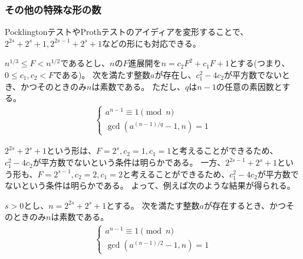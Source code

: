 \subsubsection{その他の特殊な形の数}
PocklingtonテストやProthテストのアイディアを変形することで、$2^{2s}+2^s+1, 2^{2s-1}+2^s+1$などの形にも対応できる。

\begin{Theo}{}{}
$n^{1/3}\le F< n^{1/2}$であるとし、$n$の$F$進展開を$n=c_2F^2+c_1F+1$とする(つまり、$0\le c_1,c_2<F$である)。
次を満たす整数$a$が存在し、$c_1^2-4c_2$が平方数でないとき、かつそのときのみ$n$は素数である。
ただし、$q$は$n-1$の任意の素因数とする。
\begin{align*}
\begin{cases}
a^{n-1} \equiv 1 \pmod{n}\\
\gcd(a^{(n-1)/q}-1, n) = 1
\end{cases}
\end{align*}
\end{Theo}

$2^{2s}+2^s+1$という形は、$F=2^s,c_2=1,c_1=1$と考えることができるため、$c_1^2-4c_2$が平方数でないという条件は明らかである。
一方、$2^{2s-1}+2^s+1$という形も、$F=2^{s-1},c_2=2,c_1=2$と考えることができるため、$c_1^2-4c_2$が平方数でないという条件は明らかである。
よって、例えば次のような結果が得られる。

\begin{Coro}{}{}
$s>0$とし、$n=2^{2s}+2^s+1$とする。
次を満たす整数$a$が存在するとき、かつそのときのみ$n$は素数である。
\begin{align*}
\begin{cases}
a^{n-1} \equiv 1 \pmod{n}\\
\gcd(a^{(n-1)/2}-1, n) = 1
\end{cases}
\end{align*}
\end{Coro}
